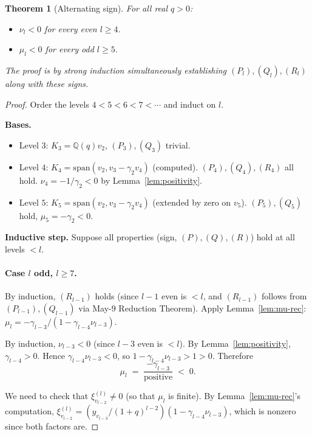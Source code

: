 \documentclass[11pt]{article}
\newtheorem{theorem}{Theorem}
\theoremstyle{definition}
\begin{document}
\begin{theorem}[Alternating sign]\label{thm:alt-sign}
For all real $q > 0$:
\begin{itemize}[topsep=0.3em,itemsep=0.2em,leftmargin=2em]
\item $\nu_l < 0$ for every even $l \ge 4$.
\item $\mu_l < 0$ for every odd $l \ge 5$.
\end{itemize}
The proof is by strong induction simultaneously establishing
$(P_l), (Q_l), (R_l)$ along with these signs.
\end{theorem}

\begin{proof}
Order the levels $4 < 5 < 6 < 7 < \cdots$ and induct on $l$.

\textbf{Bases.}
\begin{itemize}[topsep=0.3em,itemsep=0.2em,leftmargin=2em]
\item Level $3$: $K_3 = \mathbb{Q}(q) v_2$, $(P_3), (Q_3)$ trivial.
\item Level $4$: $K_4 = \mathrm{span}(v_2, v_3 - \gamma_2 v_4)$
  (computed). $(P_4), (Q_4), (R_4)$ all hold.  $\nu_4 = -1/\gamma_2 < 0$
  by Lemma~\ref{lem:positivity}.
\item Level $5$: $K_5 = \mathrm{span}(v_2, v_3 - \gamma_2 v_4)$
  (extended by zero on $v_5$).  $(P_5), (Q_5)$ hold, $\mu_5 = -\gamma_2 < 0$.
\end{itemize}

\textbf{Inductive step.} Suppose all properties (sign, $(P), (Q),
(R)$) hold at all levels $< l$.

\paragraph{Case $l$ odd, $l \ge 7$.}
By induction, $(R_{l-1})$ holds (since $l-1$ even is $< l$, and
$(R_{l-1})$ follows from $(P_{l-1}), (Q_{l-1})$ via May-9
Reduction Theorem).  Apply Lemma~\ref{lem:mu-rec}:
$\mu_l = -\gamma_{l-3}/(1 - \gamma_{l-4}\nu_{l-3})$.

By induction, $\nu_{l-3} < 0$ (since $l-3$ even is $< l$).  By
Lemma~\ref{lem:positivity}, $\gamma_{l-4} > 0$.  Hence $\gamma_{l-4}
\nu_{l-3} < 0$, so $1 - \gamma_{l-4}\nu_{l-3} > 1 > 0$.  Therefore
\[
   \mu_l \;=\; \frac{-\gamma_{l-3}}{\text{positive}} \;<\; 0.
\]

We need to check that $\xi^{(l)}_{v_{l-2}} \neq 0$ (so that $\mu_l$
is finite).  By Lemma~\ref{lem:mu-rec}'s computation,
$\xi^{(l)}_{v_{l-2}} = (y_{v_{l-3}}/(1+q)^{l-2})(1 - \gamma_{l-4}\nu_{l-3})$,
which is nonzero since both factors are.


\end{proof}
\end{document}

